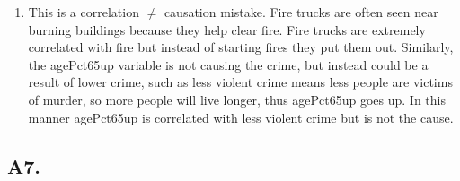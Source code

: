 \documentclass[12pt]{article}
\theoremstyle{definitionstyle}
\begin{document}
\begin{enumerate}[label=\alph*.]
        \item This is a correlation $\neq$ causation mistake. Fire trucks are often seen near burning buildings because they help clear fire. Fire trucks are extremely correlated with fire but instead of starting fires they put them out. Similarly, the agePct65up variable is not causing the crime, but instead could be a result of lower crime, such as less violent crime means less people are victims of murder, so more people will live longer, thus agePct65up goes up. In this manner agePct65up is correlated with less violent crime but is not the cause. 
    \end{enumerate}

    \subsection*{A7.}
\end{document}
